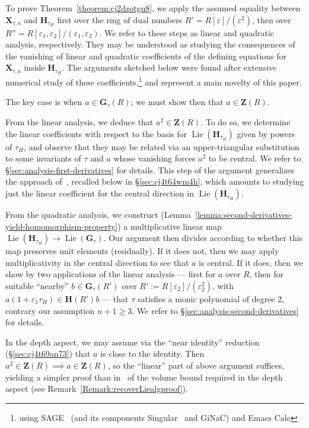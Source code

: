 \documentclass[reqno]{amsart}
\def\eps{\varepsilon}
\DeclareMathOperator{\Lie}{Lie}
\theoremstyle{plain} \newtheorem{theorem} {Theorem} \newtheorem{conjecture} {Conjecture} \newtheorem{corollary} [theorem] {Corollary} \newtheorem{proposition} [theorem] {Proposition} \newtheorem{fact} [theorem] {Fact}
\theoremstyle{definition} \newtheorem{definition} [theorem] {Definition}
\theoremstyle{itplain} %
\begin{document}
To prove Theorem~\ref{theorem:cj2dzotgu8}, we apply the assumed equality between $\mathbf{X}_{\tau,a}$ and $\mathbf{H}_{\tau_H}$ first over the ring of dual numbers $R' = R[\eps]/(\eps^2)$, then over $R'' = R[\eps_1,\eps_2]/(\eps_1,\eps_2)$.  We refer to these steps as linear and quadratic analysis, respectively.  They may be understood as studying the consequences of the vanishing of linear and quadratic coefficients of the defining equations for $\mathbf{X}_{\tau,a}$ inside $\mathbf{H}_{\tau_H}$.  The arguments sketched below were found after extensive numerical study of these coefficients,\footnote{using SAGE~\cite{sage2023} (and its components Singular~\cite{DGPS} and GiNaC) and Emacs Calc} and represent a main novelty of this paper.

The key case is when $a \in \mathbf{G}_\tau(R)$; we must show then that $a \in \mathbf{Z}(R)$.

From the linear analysis, we deduce that $a^2 \in \mathbf{Z}(R)$.  To do so, we determine the linear coefficients with respect to the basis for $\Lie(\mathbf{H}_{\tau_H})$ given by powers of $\tau_H$, and observe that they may be related via an upper-triangular substitution to some invariants of $\tau$ and $a$ whose vanishing forces $a^2$ to be central.  We refer to \S\ref{sec:analysis-first-derivatives} for details.  This step of the argument generalizes the approach of~\cite{2020arXiv201202187N}, recalled below in \S\ref{sec:cj4t64wm4h}, which amounts to studying just the linear coefficient for the central direction in $\Lie(\mathbf{H}_{\tau_H})$.

From the quadratic analysis, we construct (Lemma~\ref{lemma:second-derivatives-yield-homomorphism-property}) a multiplicative linear map $\Lie(\mathbf{H}_{\tau_H}) \rightarrow \Lie(\mathbf{G}_{\tau})$.  Our argument then divides according to whether this map preserves unit elements (residually).  If it does not, then we may apply multiplicativity in the central direction to see that $a$ is central.  If it does, then we show by two applications of the linear analysis --- first for $a$ over $R$, then for suitable ``nearby'' $b \in \mathbf{G}_{\tau}(R')$ over $R' := R[\eps_2]/(\eps_2^2)$, with $a(1+\eps_1\tau_H) \in \mathbf{H}(R') b$ --- that $\tau$ satisfies a monic polynomial of degree $2$, contrary our assumption $n+1\geq 3$.  We refer to \S\ref{sec:analysis-second-derivatives} for details.

\begin{remark}
  In the depth aspect, we may assume via the ``near identity'' reduction (\S\ref{sec:cj4t69an73}) that $a$ is close to the identity. Then $a^2 \in \mathbf{Z}(R) \implies a \in \mathbf{Z}(R)$, so the ``linear'' part of above argument suffices, yielding a simpler proof than in~\cite{2020arXiv201202187N} of the volume bound required in the depth aspect (see Remark~\ref{Remark:recoverLiealgproof}).
\end{remark}
\end{document}
